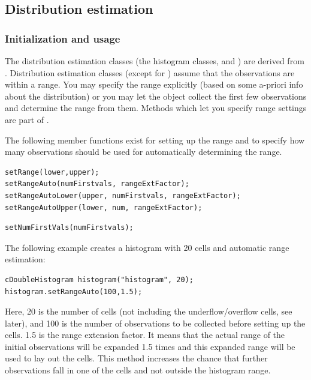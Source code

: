 \subsection{Distribution estimation}

\subsubsection{Initialization and usage}


The distribution estimation classes (the histogram classes,
 and ) are derived from
. Distribution estimation classes (except for
) assume that the observations are within a range.
You may specify the range explicitly (based on some a-priori info
about the distribution) or you may let the object collect the first
few observations and determine the range from them. Methods which let
you specify range settings are part of .

The following member functions exist for setting up the range
and to specify how many observations should be used for
automatically determining the range.

\begin{verbatim}
setRange(lower,upper);
setRangeAuto(numFirstvals, rangeExtFactor);
setRangeAutoLower(upper, numFirstvals, rangeExtFactor);
setRangeAutoUpper(lower, num, rangeExtFactor);
\end{verbatim}

\begin{verbatim}
setNumFirstVals(numFirstvals);
\end{verbatim}

The following example creates a histogram with 20 cells and automatic
range estimation:

\begin{verbatim}
cDoubleHistogram histogram("histogram", 20);
histogram.setRangeAuto(100,1.5);
\end{verbatim}


Here, 20 is the number of cells (not including the underflow/overflow
cells, see later), and 100 is the number of observations to be
collected before setting up the cells. 1.5 is the range extension
factor. It means that the actual range of the initial observations
will be expanded 1.5 times and this expanded range will be used to lay
out the cells. This method increases the chance that further
observations fall in one of the cells and not outside the histogram
range.

